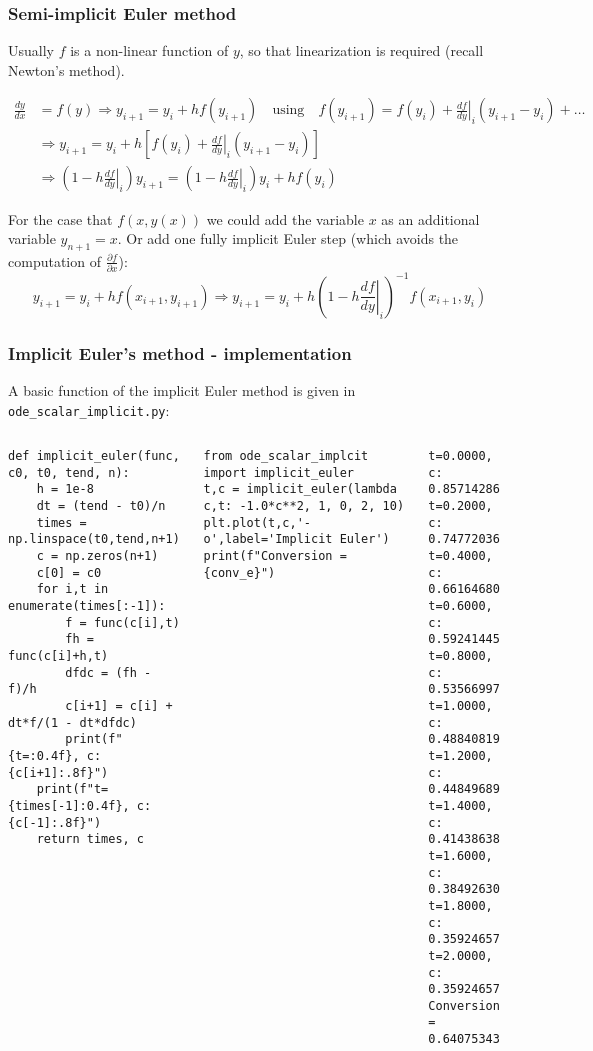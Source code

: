 \begin{frame}
  \frametitle{Semi-implicit Euler method}
  \footnotesize\selectfont
  Usually $f$ is a non-linear function of $y$, so that linearization is required (recall Newton's method).
  
  \begin{align*}
    \frac{dy}{dx} &= f(y) \Rightarrow y_{i+1} = y_i + h f (y_{i+1}) \quad \text{using} \quad f(y_{i+1}) = f(y_i) + \left.\frac{df}{dy}\right|_i(y_{i+1}-y_i) + \ldots \\
  &\Rightarrow y_{i+1} =  y_i + h \left[ f(y_i) + \left.\frac{df}{dy}\right|_i (y_{i+1}-y_i) \right] \\ 
  &\Rightarrow \left(1-h\left.\frac{df}{dy}\right|_i \right)y_{i+1} = \left(1-h\left.\frac{df}{dy}\right|_i\right)y_i + h f(y_i) 
  \end{align*}
  
  \pause
  For the case that $f(x,y(x))$ we could add the variable $x$ as an additional variable $y_{n+1}=x$. Or add one fully implicit Euler step (which avoids the computation of $\frac{\partial f}{\partial x}$): \vspace*{-1em}
  \[
    y_{i+1} = y_i + h f(x_{i+1},y_{i+1}) \Rightarrow y_{i+1} = y_i + h \left(1-h\left.\frac{df}{dy}\right|_i \right)^{-1} f(x_{i+1},y_i)
  \]
\end{frame}


\begin{frame}[fragile]
  \frametitle{Implicit Euler's method - implementation}
  A basic function of the implicit Euler method is given in \lstinline$ode_scalar_implicit.py$:
  \begin{columns}
      \begin{lstlisting}
def implicit_euler(func, c0, t0, tend, n):
    h = 1e-8
    dt = (tend - t0)/n
    times = np.linspace(t0,tend,n+1)
    c = np.zeros(n+1)
    c[0] = c0
    for i,t in enumerate(times[:-1]):
        f = func(c[i],t)
        fh = func(c[i]+h,t)
        dfdc = (fh - f)/h
        c[i+1] = c[i] + dt*f/(1 - dt*dfdc)
        print(f"{t=:0.4f}, c: {c[i+1]:.8f}")
    print(f"t={times[-1]:0.4f}, c: {c[-1]:.8f}")
    return times, c
  \end{lstlisting}
  \pause
      \begin{lstlisting}
from ode_scalar_implcit import implicit_euler
t,c = implicit_euler(lambda c,t: -1.0*c**2, 1, 0, 2, 10)
plt.plot(t,c,'-o',label='Implicit Euler')
print(f"Conversion = {conv_e}")
      \end{lstlisting}
    \pause
      \begin{lstlisting}[style=PyOutput]
t=0.0000, c: 0.85714286
t=0.2000, c: 0.74772036
t=0.4000, c: 0.66164680
t=0.6000, c: 0.59241445
t=0.8000, c: 0.53566997
t=1.0000, c: 0.48840819
t=1.2000, c: 0.44849689
t=1.4000, c: 0.41438638
t=1.6000, c: 0.38492630
t=1.8000, c: 0.35924657
t=2.0000, c: 0.35924657
Conversion = 0.64075343
      \end{lstlisting}
  \end{columns}
\end{frame}

